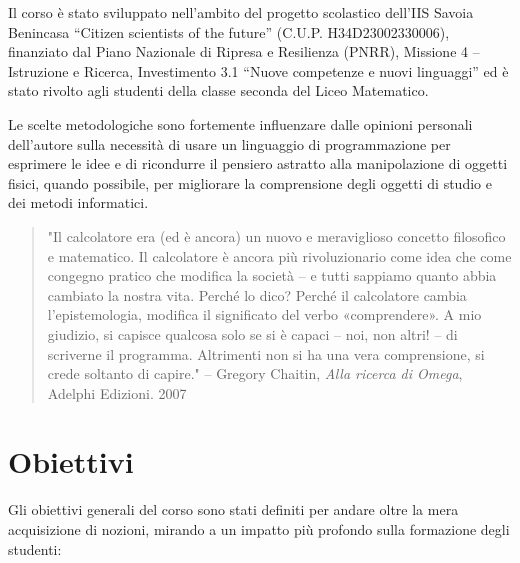 \documentclass[withtimes]{easychair}
\begin{document}
Il corso è stato sviluppato nell'ambito del progetto scolastico dell'IIS Savoia Benincasa ``Citizen scientists of the future'' (C.U.P. H34D23002330006), finanziato dal Piano Nazionale di Ripresa e Resilienza (PNRR), Missione 4 -- Istruzione e Ricerca, Investimento 3.1 ``Nuove competenze e nuovi linguaggi'' ed è stato rivolto agli studenti della classe seconda del Liceo Matematico.

Le scelte metodologiche sono fortemente influenzare dalle opinioni personali dell'autore sulla necessità di usare un linguaggio di programmazione per esprimere le idee e di ricondurre il pensiero astratto alla manipolazione di oggetti fisici, quando possibile, per migliorare la comprensione degli oggetti di studio e dei metodi informatici.

\begin{quote}
    "Il calcolatore era (ed è ancora) un nuovo e meraviglioso concetto filosofico e matematico. Il calcolatore è ancora più rivoluzionario come idea che come congegno pratico che modifica la società -- e tutti sappiamo quanto abbia cambiato la nostra vita. Perché lo dico? Perché il calcolatore cambia l'epistemologia, modifica il significato del verbo «comprendere». A mio giudizio, si capisce qualcosa solo se si è capaci -- noi, non altri! -- di scriverne il programma. Altrimenti non si ha una vera comprensione, si crede soltanto di capire."
    \small{-- Gregory Chaitin, \textit{Alla ricerca di Omega}, Adelphi Edizioni. 2007}
\end{quote}

\section{Obiettivi}\label{obiettivi-del-corso}

Gli obiettivi generali del corso sono stati definiti per andare oltre la mera acquisizione di nozioni, mirando a un impatto più profondo sulla formazione degli studenti:
\end{document}
